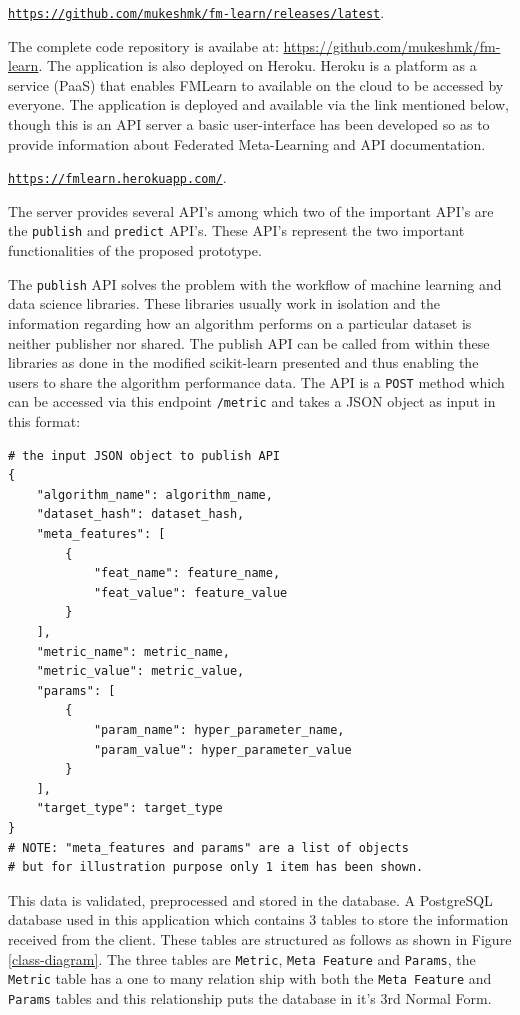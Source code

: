 \begin{center}
\href{https://github.com/mukeshmk/fm-learn/releases/latest}
{\texttt{https://github.com/mukeshmk/fm-learn/releases/latest}}.
\end{center}

The complete code repository is availabe at: \href{https://github.com/mukeshmk/fm-learn}{https://github.com/mukeshmk/fm-learn}. The application is also deployed on Heroku. Heroku is a platform as a service (PaaS) that enables FMLearn to available on the cloud to be accessed by everyone. The application is deployed and available via the link mentioned below, though this is an API server a basic user-interface has been developed so as to provide information about Federated Meta-Learning and API documentation.

\begin{center}
\href{https://fmlearn.herokuapp.com/}
{\texttt{https://fmlearn.herokuapp.com/}}.
\end{center}

The server provides several API's among which two of the important API's are the \texttt{publish} and \texttt{predict} API's. These API's represent the two important functionalities of the proposed prototype. 

The \texttt{publish} API solves the problem with the workflow of machine learning and data science libraries. These libraries usually work in isolation and the information regarding how an algorithm performs on a particular dataset is neither publisher nor shared. The publish API can be called from within these libraries as done in the modified scikit-learn presented and thus enabling the users to share the algorithm performance data. The API is a \texttt{POST} method which can be accessed via this endpoint \texttt{/metric} and takes a JSON object as input in this format:

\begin{lstlisting}
# the input JSON object to publish API
{
	"algorithm_name": algorithm_name,
	"dataset_hash": dataset_hash,
	"meta_features": [
		{
			"feat_name": feature_name,
			"feat_value": feature_value
		}
	],
	"metric_name": metric_name,
	"metric_value": metric_value,
	"params": [
		{
			"param_name": hyper_parameter_name,
			"param_value": hyper_parameter_value
		}
	],
	"target_type": target_type
}
# NOTE: "meta_features and params" are a list of objects
# but for illustration purpose only 1 item has been shown.
\end{lstlisting}

This data is validated, preprocessed and stored in the database. A PostgreSQL database used in this application which contains 3 tables to store the information received from the client. These tables are structured as follows as shown in Figure \ref{class-diagram}. The three tables are \texttt{Metric}, \texttt{Meta Feature} and \texttt{Params}, the \texttt{Metric} table has a one to many relation ship with both the \texttt{Meta Feature} and \texttt{Params} tables and this relationship puts the database in it's 3rd Normal Form.

